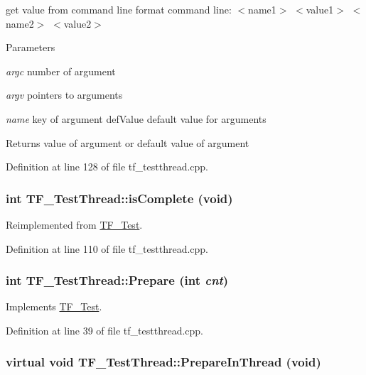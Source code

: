 get value from command line format command line: $<$name1$>$ $<$value1$>$ $<$name2$>$ $<$value2$>$


\begin{DoxyParams}{Parameters}
\item[{\em argc}]number of argument \item[{\em argv}]pointers to arguments \item[{\em name}]key of argument  defValue default value for arguments\end{DoxyParams}
\begin{DoxyReturn}{Returns}
value of argument or default value of argument 
\end{DoxyReturn}


Definition at line 128 of file tf\_\-testthread.cpp.\hypertarget{classTF__TestThread_a323fe5eecb67f390ee0fada90ade5ed2}{
\subsubsection[{isComplete}]{\setlength{\rightskip}{0pt plus 5cm}int TF\_\-TestThread::isComplete (void)}}
\label{classTF__TestThread_a323fe5eecb67f390ee0fada90ade5ed2}


Reimplemented from \hyperlink{classTF__Test_a14768dc0dba16b2cb7be89e8e7c2b3b0}{TF\_\-Test}.

Definition at line 110 of file tf\_\-testthread.cpp.\hypertarget{classTF__TestThread_acfc9a31db91472deb811a47c1cf8e20f}{
\subsubsection[{Prepare}]{\setlength{\rightskip}{0pt plus 5cm}int TF\_\-TestThread::Prepare (int {\em cnt})}}
\label{classTF__TestThread_acfc9a31db91472deb811a47c1cf8e20f}


Implements \hyperlink{classTF__Test_a26630dcec87c80cd27ab33e3791fbe19}{TF\_\-Test}.

Definition at line 39 of file tf\_\-testthread.cpp.\hypertarget{classTF__TestThread_aebd5daf255a209019d018bc363021433}{
\subsubsection[{PrepareInThread}]{\setlength{\rightskip}{0pt plus 5cm}virtual void TF\_\-TestThread::PrepareInThread (void)}}
\label{classTF__TestThread_aebd5daf255a209019d018bc363021433}


